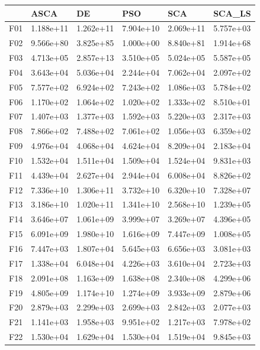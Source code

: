 \begin{tabular}{llllll}
\toprule
{} &       ASCA &         DE &        PSO &        SCA &     SCA\_LS \\
\midrule
F01  &  1.188e+11 &  1.262e+11 &  7.904e+10 &  2.069e+11 &  5.757e+03 \\
F02  &  9.566e+80 &  3.825e+85 &  1.000e+00 &  8.840e+81 &  1.914e+68 \\
F03  &  4.713e+05 &  2.857e+13 &  3.510e+05 &  5.024e+05 &  5.587e+05 \\
F04  &  3.643e+04 &  5.036e+04 &  2.244e+04 &  7.062e+04 &  2.097e+02 \\
F05  &  7.577e+02 &  6.924e+02 &  7.243e+02 &  1.086e+03 &  5.784e+02 \\
F06  &  1.170e+02 &  1.064e+02 &  1.020e+02 &  1.333e+02 &  8.510e+01 \\
F07  &  1.407e+03 &  1.377e+03 &  1.592e+03 &  5.220e+03 &  2.317e+03 \\
F08  &  7.866e+02 &  7.488e+02 &  7.061e+02 &  1.056e+03 &  6.359e+02 \\
F09  &  4.976e+04 &  4.068e+04 &  4.624e+04 &  8.209e+04 &  2.183e+04 \\
F10  &  1.532e+04 &  1.511e+04 &  1.509e+04 &  1.524e+04 &  9.831e+03 \\
F11  &  4.439e+04 &  2.627e+04 &  2.944e+04 &  6.008e+04 &  8.826e+02 \\
F12  &  7.336e+10 &  1.306e+11 &  3.732e+10 &  6.320e+10 &  7.328e+07 \\
F13  &  3.186e+10 &  1.020e+11 &  1.341e+10 &  2.568e+10 &  1.239e+05 \\
F14  &  3.646e+07 &  1.061e+09 &  3.999e+07 &  3.269e+07 &  4.396e+05 \\
F15  &  6.091e+09 &  1.980e+10 &  1.616e+09 &  7.447e+09 &  1.008e+05 \\
F16  &  7.447e+03 &  1.807e+04 &  5.645e+03 &  6.656e+03 &  3.081e+03 \\
F17  &  1.338e+04 &  6.048e+04 &  4.226e+03 &  3.610e+04 &  2.723e+03 \\
F18  &  2.091e+08 &  1.163e+09 &  1.638e+08 &  2.340e+08 &  4.299e+06 \\
F19  &  4.805e+09 &  1.174e+10 &  1.274e+09 &  3.933e+09 &  2.879e+06 \\
F20  &  2.879e+03 &  2.299e+03 &  2.699e+03 &  2.842e+03 &  2.077e+03 \\
F21  &  1.141e+03 &  1.958e+03 &  9.951e+02 &  1.217e+03 &  7.978e+02 \\
F22  &  1.530e+04 &  1.629e+04 &  1.530e+04 &  1.519e+04 &  9.845e+03 \\

\end{tabular}
